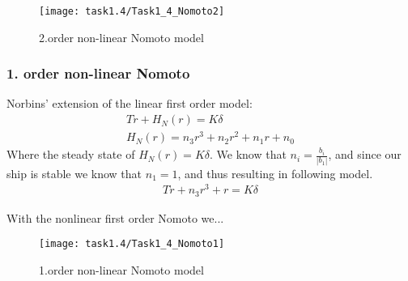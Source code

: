 \begin{figure}[h]
    \centering
    \texttt{[image: task1.4/Task1\_4\_Nomoto2]}
    \caption{2.order non-linear Nomoto model}
    \label{fig:nomoto2_nonlin}
\end{figure}

\subsubsection*{1. order non-linear Nomoto}
Norbins' extension of the linear first order model:
\begin{equation}
\begin{split}
	T\dot{r}+H_N(r)=K\delta \\
	H_N(r) = n_3r^3 + n_2r^2 + n_1r + n_0
\end{split}
\end{equation}
Where the steady state of $H_N(r)=K\delta$. We know that $n_i = \frac{b_i}{|b_1|}$, and since our ship is stable we know that $n_1=1$, and thus resulting in following model.
\begin{equation}
\begin{split}
	T\dot{r}+n_3r^3 + r=K\delta
\end{split}
\end{equation}


With the nonlinear first order Nomoto we...

\begin{figure}[h]
    \centering
    \texttt{[image: task1.4/Task1\_4\_Nomoto1]}
    \caption{1.order non-linear Nomoto model}
    \label{fig:nomoto1_nonlin}
\end{figure}
